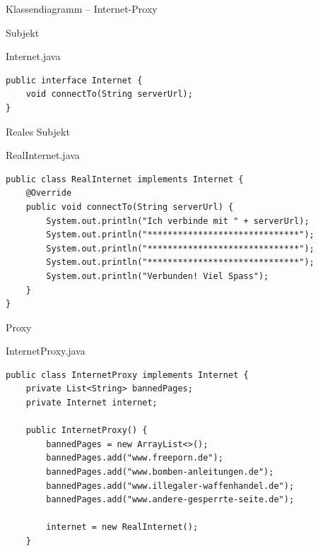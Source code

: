 \begin{frame}{Klassendiagramm -- Internet-Proxy}
\end{frame}

\begin{frame}[fragile]{Subjekt}
	\begin{exampleblock}{Internet.java}
        \begin{lstlisting}
public interface Internet {
	void connectTo(String serverUrl);
}
        \end{lstlisting}
 	\end{exampleblock}
\end{frame}

\begin{frame}[fragile]{Reales Subjekt}
	\begin{exampleblock}{RealInternet.java}
        \begin{lstlisting}
public class RealInternet implements Internet {
	@Override
	public void connectTo(String serverUrl) {
		System.out.println("Ich verbinde mit " + serverUrl);
		System.out.println("******************************");
		System.out.println("******************************");
		System.out.println("******************************");
		System.out.println("Verbunden! Viel Spass");
	}
}
        \end{lstlisting}
 	\end{exampleblock}
\end{frame}

\begin{frame}[fragile]{Proxy}
	\begin{exampleblock}{InternetProxy.java}
        \begin{lstlisting}
public class InternetProxy implements Internet {
	private List<String> bannedPages;
	private Internet internet;
	
	public InternetProxy() {
		bannedPages = new ArrayList<>();
		bannedPages.add("www.freeporn.de");
		bannedPages.add("www.bomben-anleitungen.de");
		bannedPages.add("www.illegaler-waffenhandel.de");
		bannedPages.add("www.andere-gesperrte-seite.de");
		
		internet = new RealInternet();
	}
        \end{lstlisting}
 	\end{exampleblock}
\end{frame}

